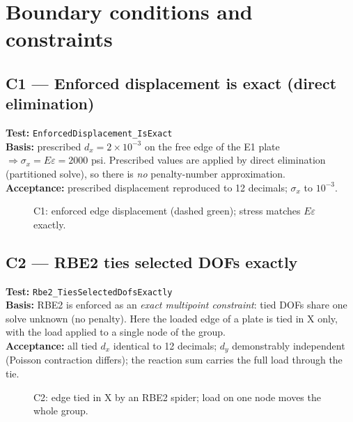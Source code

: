\documentclass[11pt,a4paper]{article}
\newcommand{\wall}[3]{%
  \draw[thick] (#1,#2) -- (#1,#3);
  \fill[pattern=north east lines] (#1-0.18,#2) rectangle (#1,#3);
}
\begin{document}
\section{Boundary conditions and constraints}

\subsection{C1 --- Enforced displacement is exact (direct elimination)}
\textbf{Test:} \texttt{EnforcedDisplacement\_IsExact}\\
\textbf{Basis:} prescribed $d_x = 2\times10^{-3}$ on the free edge of the E1
plate $\Rightarrow \sigma_x = E\varepsilon = 2000$ psi. Prescribed values are
applied by direct elimination (partitioned solve), so there is \emph{no}
penalty-number approximation.\\
\textbf{Acceptance:} prescribed displacement reproduced to 12 decimals;
$\sigma_x$ to $10^{-3}$.

\begin{figure}[H]\centering
{}
\caption{C1: enforced edge displacement (dashed green); stress matches $E\varepsilon$ exactly.}
\end{figure}

\subsection{C2 --- RBE2 ties selected DOFs exactly}
\textbf{Test:} \texttt{Rbe2\_TiesSelectedDofsExactly}\\
\textbf{Basis:} RBE2 is enforced as an \emph{exact multipoint constraint}: tied
DOFs share one solve unknown (no penalty). Here the loaded edge of a plate is
tied in X only, with the load applied to a single node of the group.\\
\textbf{Acceptance:} all tied $d_x$ identical to 12 decimals; $d_y$
demonstrably independent (Poisson contraction differs); the reaction sum
carries the full load through the tie.

\begin{figure}[H]\centering
{}
\caption{C2: edge tied in X by an RBE2 spider; load on one node moves the whole group.}
\end{figure}
\end{document}
